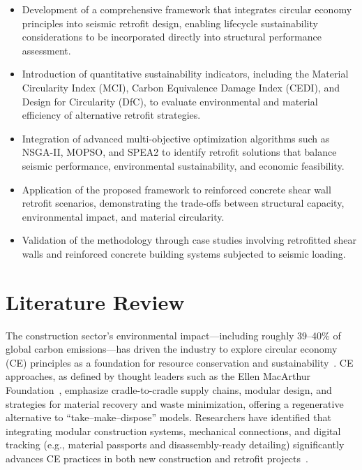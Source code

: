 \documentclass[fleqn,10pt]{wlscirep}
\begin{document}
\begin{itemize}

\item Development of a comprehensive framework that integrates circular economy
principles into seismic retrofit design, enabling lifecycle sustainability
considerations to be incorporated directly into structural performance assessment.

\item Introduction of quantitative sustainability indicators, including the
Material Circularity Index (MCI), Carbon Equivalence Damage Index (CEDI), and
Design for Circularity (DfC), to evaluate environmental and material efficiency
of alternative retrofit strategies.

\item Integration of advanced multi-objective optimization algorithms such as
NSGA-II, MOPSO, and SPEA2 to identify retrofit solutions that balance seismic
performance, environmental sustainability, and economic feasibility.

\item Application of the proposed framework to reinforced concrete shear wall
retrofit scenarios, demonstrating the trade-offs between structural capacity,
environmental impact, and material circularity.

\item Validation of the methodology through case studies involving retrofitted
shear walls and reinforced concrete building systems subjected to seismic
loading.

\end{itemize}



\section{Literature Review}
The construction sector's environmental impact---including roughly 39--40\% of global
carbon emissions---has driven the industry to explore circular economy (CE) principles
as a foundation for resource conservation and sustainability~\cite{globalabc2023}.
CE approaches, as defined by thought leaders such as the Ellen MacArthur
Foundation~\cite{emf_mci_2015}, emphasize cradle-to-cradle supply chains, modular
design, and strategies for material recovery and waste minimization, offering a
regenerative alternative to ``take--make--dispose'' models. Researchers have identified
that integrating modular construction systems, mechanical connections, and digital
tracking (e.g., material passports and disassembly-ready detailing) significantly
advances CE practices in both new construction and retrofit
projects~\cite{ec_levels,globalabc_dfd_2025}.
\end{document}
